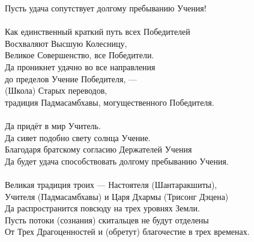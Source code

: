 Пусть удача сопутствует долгому пребыванию Учения!\\
\\
\newpage
Как единственный краткий путь всех Победителей\\
Восхваляют Высшую Колесницу, \\ \indent Великое Совершенство, все Победители.\\
Да проникнет удачно во все направления \\ \indent до пределов Учение Победителя, —\\
(Школа) Старых переводов, \\ \indent традиция Падмасамбхавы, могущественного Победителя.\\
\\
Да придёт в мир Учитель.\\
Да сияет подобно свету солнца Учение.\\
Благодаря братскому согласию Держателей Учения\\
Да будет удача способствовать долгому пребыванию Учения.\\
\\
Великая традиция троих — Настоятеля (Шантаракшиты),\\
Учителя (Падмасамбхавы) и Царя Дхармы (Трисонг Дэцена)\\
Да распространится повсюду на трех уровнях Земли.\\
Пусть потоки (сознания) скитальцев не будут отделены\\
От Трех Драгоценностей и (обретут) благочестие в трех временах.\\
\newpage
